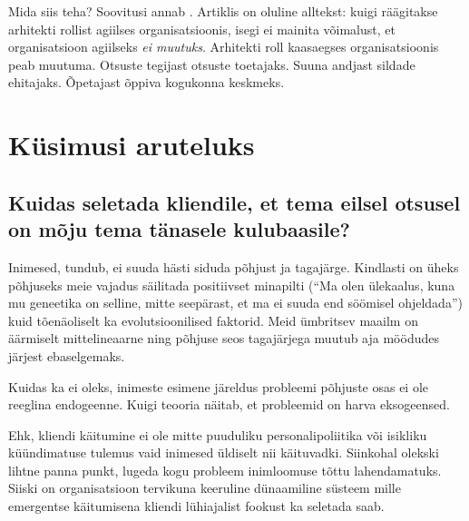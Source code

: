 \documentclass{tufte-book}
\begin{document}
Mida siis teha? Soovitusi annab \cite{fowlerlean}. Artiklis on oluline alltekst: kuigi räägitakse arhitekti rollist agiilses organisatsioonis, isegi ei mainita võimalust, et organisatsioon agiilseks \emph{ei muutuks}. Arhitekti roll kaasaegses organisatsioonis peab muutuma. Otsuste tegijast otsuste toetajaks. Suuna andjast sildade ehitajaks. Õpetajast õppiva kogukonna keskmeks. 

\section{Küsimusi aruteluks}
\subsection{Kuidas seletada kliendile, et tema eilsel otsusel on mõju tema tänasele kulubaasile?}
\label{sec:business:q1}
Inimesed, tundub, ei suuda hästi siduda põhjust ja tagajärge. Kindlasti on üheks põhjuseks meie vajadus säilitada positiivset minapilti (\enquote{Ma olen ülekaalus, kuna mu geneetika on selline, mitte seepärast, et ma ei suuda end söömisel ohjeldada}) kuid tõenäoliselt ka evolutsioonilised faktorid. Meid ümbritsev maailm on äärmiselt mittelineaarne ning põhjuse seos tagajärjega muutub aja möödudes järjest ebaselgemaks. 

Kuidas ka ei oleks, inimeste esimene järeldus probleemi põhjuste osas ei ole reeglina endogeenne. Kuigi teooria näitab, et probleemid on harva eksogeensed. 

Ehk, kliendi käitumine ei ole mitte puuduliku personalipoliitika või isikliku küündimatuse tulemus vaid inimesed üldiselt nii käituvadki. Siinkohal olekski lihtne panna punkt, lugeda kogu probleem inimloomuse tõttu lahendamatuks. Siiski on organisatsioon tervikuna keeruline dünaamiline süsteem mille emergentse käitumisena kliendi lühiajalist fookust ka seletada saab. 
\end{document}
